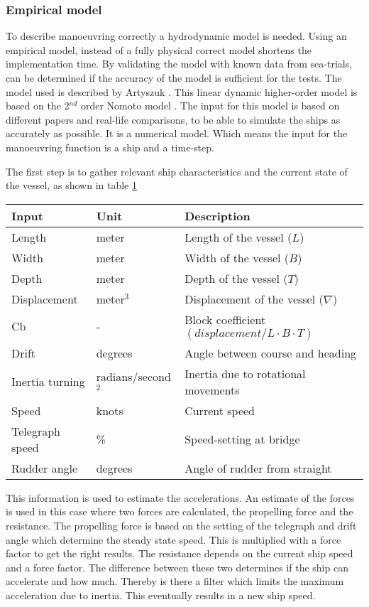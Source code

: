 \subsubsection{Empirical model}
To describe manoeuvring correctly a hydrodynamic model is needed. Using an empirical model, instead of a fully physical correct model shortens the implementation time. By validating the model with known data from sea-trials, can be determined if the accuracy of the model is sufficient for the tests. The model used is described by Artyszuk \cite{Artyszuk2016}. This linear dynamic higher-order model is based on the 2$^{nd}$ order Nomoto model \cite{Nomoto1957}. The input for this model is based on different papers and real-life comparisons, to be able to simulate the ships as accurately as possible. It is a numerical model. Which means the input for the manoeuvring function is a ship and a time-step.

The first step is to gather relevant ship characteristics and the current state of the vessel, as shown in table \ref{tab:input-hydro-model}
\begin{table}[p]
	\centering
	\begin{tabular}{p{}|p{}|p{}}
		\toprule
		Input & Unit & Description\\
		\midrule
		Length & meter & Length of the vessel ($L$)\\
		Width & meter & Width of the vessel ($B$)\\
		Depth & meter & Depth of the vessel ($T$)\\
		Displacement & meter$^3$ & Displacement of the vessel ($\nabla$)\\
		Cb & - & Block coefficient $(displacement / L \cdot B \cdot T)$ \\
		Drift & degrees & Angle between course and heading \\
		Inertia turning & radians/second$^2$ & Inertia due to rotational movements \\
		Speed & knots & Current speed \\
		Telegraph speed & \% & Speed-setting at bridge\\
		Rudder angle & degrees & Angle of rudder from straight \\
		\bottomrule
	\end{tabular}
	
	\label{tab:input-hydro-model}
\end{table}

This information is used to estimate the accelerations. An estimate of the forces is used in this case where two forces are calculated, the propelling force and the resistance. The propelling force is based on the setting of the telegraph and drift angle which determine the steady state speed. This is multiplied with a force factor to get the right results. The resistance depends on the current ship speed and a force factor. The difference between these two determines if the ship can accelerate and how much. Thereby is there a filter which limits the maximum acceleration due to inertia. This eventually results in a new ship speed.


